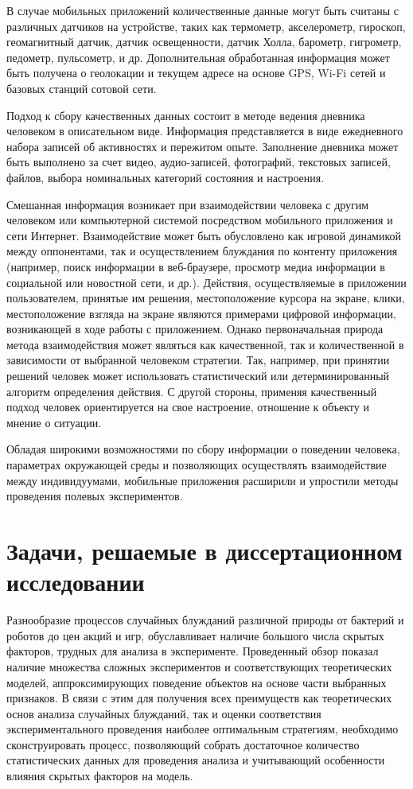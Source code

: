 В случае мобильных приложений количественные данные могут быть считаны с различных датчиков на устройстве, таких как термометр, акселерометр, гироскоп, геомагнитный датчик, датчик освещенности, датчик Холла, барометр, гигрометр, педометр, пульсометр, и др. Дополнительная обработанная информация может быть получена о геолокации и текущем адресе на основе GPS, Wi-Fi сетей и базовых станций сотовой сети.

Подход к сбору качественных данных состоит в методе ведения дневника человеком в описательном виде. Информация представляется в виде ежедневного набора записей об активностях и пережитом опыте. Заполнение дневника может быть выполнено за счет видео, аудио-записей, фотографий, текстовых записей, файлов, выбора номинальных категорий состояния и настроения.

Смешанная информация возникает при взаимодействии человека с другим человеком или компьютерной системой посредством мобильного приложения и сети Интернет. Взаимодействие может быть обусловлено как игровой динамикой между оппонентами, так и осуществлением блуждания по контенту приложения (например, поиск информации в веб-браузере, просмотр медиа информации в социальной или новостной сети, и др.). Действия, осуществляемые в приложении пользователем, принятые им решения, местоположение курсора на экране, клики, местоположение взгляда на экране являются примерами цифровой информации, возникающей в ходе работы с приложением. Однако первоначальная природа метода взаимодействия может являться как качественной, так и количественной в зависимости от выбранной человеком стратегии. Так, например, при принятии решений человек может использовать статистический или детерминированный алгоритм определения действия. С другой стороны, применяя качественный подход человек ориентируется на свое настроение, отношение к объекту и мнение о ситуации.

Обладая широкими возможностями по сбору информации о поведении человека, параметрах окружающей среды и позволяющих осуществлять взаимодействие между индивидуумами, мобильные приложения расширили и упростили методы проведения полевых экспериментов.


\section{Задачи, решаемые в диссертационном исследовании}\label{sec:ch1/sec4}

Разнообразие процессов случайных блужданий различной природы от бактерий и роботов до цен акций и игр, обуславливает наличие большого числа скрытых факторов, трудных для анализа в эксперименте. Проведенный обзор показал наличие множества сложных экспериментов и соответствующих теоретических моделей, аппроксимирующих поведение объектов на основе части выбранных признаков. В связи с этим для получения всех преимуществ как теоретических основ анализа случайных блужданий, так и оценки соответствия экспериментального проведения наиболее оптимальным стратегиям, необходимо сконструировать процесс, позволяющий собрать достаточное количество статистических данных для проведения анализа и учитывающий особенности влияния скрытых факторов на модель.

